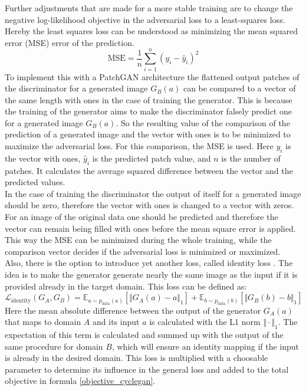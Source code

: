 Further adjustments that are made for a more stable training are to change the negative log-likelihood objective in the adversarial loss to a least-squares loss\cite{Zhu2017}.
Hereby the least squares loss can be understood as minimizing the mean squared error (MSE) error of the prediction.
\begin{equation}
    \text{MSE} = \frac{1}{n} \sum_{i=1}^{n} (y_i - \hat{y}_i)^2
\end{equation}
To implement this with a PatchGAN architecture the flattened output patches of the discriminator for a generated image $G_B(a)$ can be compared to a vector of the same length with ones in the case of training the generator.
This is because the training of the generator aims to make the discriminator falsely predict one for a generated image $G_B(a)$.
So the resulting value of the comparison of the prediction of a generated image and the vector with ones is to be minimized to maximize the adversarial loss.
For this comparison, the MSE is used.
Here $y_i$ is the vector with ones, $\hat{y}_i$ is the predicted patch value, and $n$ is the number of patches. 
It calculates the average squared difference between the vector and the predicted values.\\
In the case of training the discriminator the output of itself for a generated image should be zero, therefore the vector with ones is changed to a vector with zeros.
For an image of the original data one should be predicted and therefore the vector can remain being filled with ones before the mean square error is applied.
This way the MSE can be minimized during the whole training, while the comparison vector decides if the adversarial loss is minimized or maximized.\\
Also, there is the option to introduce yet another loss, called identity loss \cite{Zhu2017}.
The idea is to make the generator generate nearly the same image as the input if it is provided already in the target domain.
This loss can be defined as:
\begin{equation}
    \mathcal{L}_{\text{identity}}(G_A, G_B) = \mathbb{E}_{a\sim p_{\text{data}}(a)}[\Vert G_A(a) - a\Vert_1] + \mathbb{E}_{b\sim p_{\text{data}}(b)}[\Vert G_B(b) - b\Vert_1]
\end{equation}
Here the mean absolute difference between the output of the generator $G_A(a)$ that maps to domain $A$ and its input $a$ is calculated with the L1 norm $\Vert \cdot \Vert_1$.
The expectation of this term is calculated and summed up with the output of the same procedure for domain $B$, which will ensure an identity mapping if the input is already in the desired domain.
This loss is multiplied with a choosable parameter to determine its influence in the general loss and added to the total objective in formula \ref{objective_cyclegan}.

